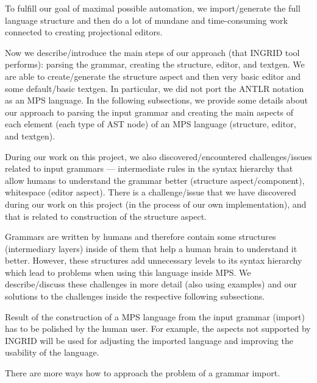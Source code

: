 To fulfill our goal of maximal possible automation, we import/generate the full language structure and then do a lot of mundane and time-consuming work connected to creating projectional editors.

Now we describe/introduce the main steps of our approach (that INGRID tool performs): parsing the grammar, creating the structure, editor, and textgen.
We are able to create/generate the structure aspect and then very basic editor and some default/basic textgen.
In particular, we did not port the ANTLR notation as an MPS language.
In the following subsections, we provide some details about our approach to parsing the input grammar and creating the main aspects of each element (each type of AST node) of an MPS language (structure, editor, and textgen).

During our work on this project, we also discovered/encountered challenges/issues related to input grammars --- intermediate rules in the syntax hierarchy that allow humans to understand the grammar better (structure aspect/component), whitespace (editor aspect).
There is a challenge/issue that we have discovered during our work on this project (in the process of our own implementation), and that is related to construction of the structure aspect.

Grammars are written by humans and therefore contain some structures (intermediary layers) inside of them that help a human brain to understand it better.
However, these structures add unnecessary levels to its syntax hierarchy which lead to problems when using this language inside MPS.
We describe/discuss these challenges in more detail (also using examples) and our solutions to the challenges inside the respective following subsections.

Result of the construction of a MPS language from the input grammar (import) has to be polished by the human user.
For example, the aspects not supported by INGRID will be used for adjusting the imported language and improving the usability of the language.

There are more ways how to approach the problem of a grammar import.

